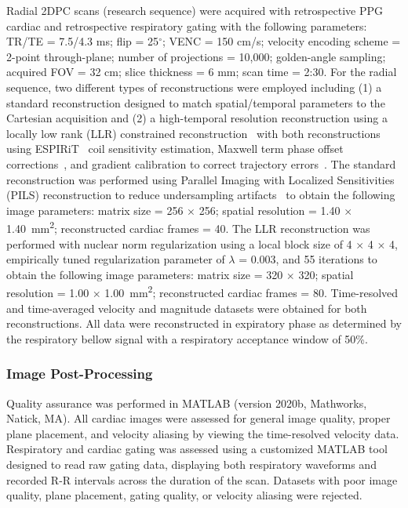 Radial 2DPC scans (research sequence) were acquired with retrospective PPG cardiac and retrospective respiratory gating with the following parameters: TR/TE = 7.5/4.3 ms; flip = 25$^\circ$; VENC = 150 cm/s; velocity encoding scheme = 2-point through-plane; number of projections = 10,000; golden-angle sampling; acquired FOV = 32 cm; slice thickness = 6 mm; scan time = 2:30. For the radial sequence, two different types of reconstructions were employed including (1) a standard reconstruction designed to match spatial/temporal parameters to the Cartesian acquisition and (2) a high-temporal resolution reconstruction using a locally low rank (LLR) constrained reconstruction~\cite{jimenezFeasibilityHighSpatiotemporal2018,haldarLowrankApproximationsDynamic2011} with both reconstructions using ESPIRiT~\cite{ueckerESPIRiTEigenvalueApproach2014} coil sensitivity estimation, Maxwell term phase offset corrections~\cite{bernsteinConcomitantGradientTerms1998}, and gradient calibration to correct trajectory errors~\cite{johnsonImproved3DPhase2008}. The standard reconstruction was performed using Parallel Imaging with Localized Sensitivities (PILS) reconstruction to reduce undersampling artifacts~\cite{griswoldPartiallyParallelImaging2000} to obtain the following image parameters: matrix size = 256 $\times$ 256; spatial resolution = 1.40 $\times$ \qty{1.40}{\mm^2}; reconstructed cardiac frames = 40. The LLR reconstruction was performed with nuclear norm regularization using a local block size of 4 $\times$ 4 $\times$ 4, empirically tuned regularization parameter of $\lambda$ = 0.003, and 55 iterations to obtain the following image parameters: matrix size = 320 $\times$ 320; spatial resolution = 1.00 $\times$ \qty{1.00}{\mm^2}; reconstructed cardiac frames = 80. Time-resolved and time-averaged velocity and magnitude datasets were obtained for both reconstructions. All data were reconstructed in expiratory phase as determined by the respiratory bellow signal with a respiratory acceptance window of 50\%. 

\subsubsection{Image Post-Processing}
Quality assurance was performed in MATLAB (version 2020b, Mathworks, Natick, MA). All cardiac images were assessed for general image quality, proper plane placement, and velocity aliasing by viewing the time-resolved velocity data. Respiratory and cardiac gating was assessed using a customized MATLAB tool designed to read raw gating data, displaying both respiratory waveforms and recorded R-R intervals across the duration of the scan. Datasets with poor image quality, plane placement, gating quality, or velocity aliasing were rejected. 

